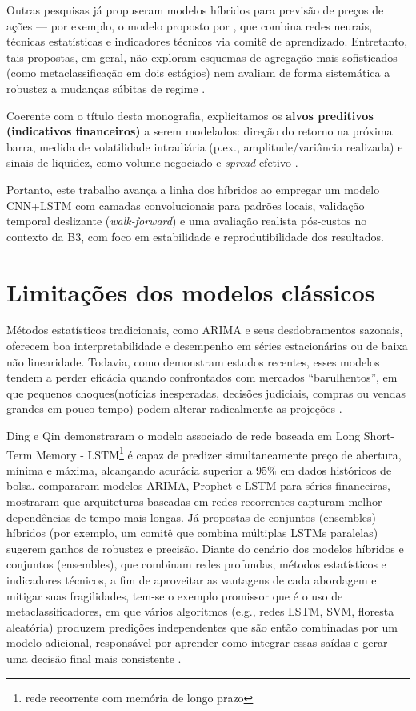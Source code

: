 Outras pesquisas já propuseram modelos híbridos para previsão de preços de ações — por exemplo, o modelo proposto por \cite{marcondes2013modelo}, que combina redes neurais, técnicas estatísticas e indicadores técnicos via comitê de aprendizado. Entretanto, tais propostas, em geral, não exploram esquemas de agregação mais sofisticados (como metaclassificação em dois estágios) nem avaliam de forma sistemática a robustez a mudanças súbitas de regime \cite{assis2022predicao,tsay2010}. 

Coerente com o título desta monografia, explicitamos os \textbf{alvos preditivos (indicativos financeiros)} a serem modelados: direção do retorno na próxima barra,  medida de volatilidade intradiária (p.ex., amplitude/variância realizada) e sinais de liquidez, como volume negociado e \textit{spread} efetivo \cite{tsay2010,dacorogna2001,wood1985,MishkinEakins2018,rotela2014arima,nascimento2023bwaif}. 

Portanto, este trabalho avança a linha dos híbridos ao empregar um modelo CNN+LSTM com camadas convolucionais para padrões locais, validação temporal deslizante (\textit{walk-forward}) e uma avaliação realista pós-custos no contexto da B3, com foco em estabilidade e reprodutibilidade dos resultados.




\section{Limitações dos modelos clássicos}

Métodos estatísticos tradicionais, como ARIMA e seus desdobramentos sazonais, oferecem boa interpretabilidade e desempenho em séries estacionárias ou de baixa não linearidade. Todavia, como demonstram estudos recentes, esses modelos tendem a perder eficácia quando confrontados com mercados “barulhentos”, em que pequenos choques(notícias inesperadas, decisões judiciais, compras ou vendas grandes em pouco tempo) podem alterar radicalmente as projeções \cite{sunki2024}. 

Ding e Qin \cite{ding2020} demonstraram o modelo associado de rede baseada em Long Short-Term Memory - LSTM\footnote{rede recorrente com memória de longo prazo} é capaz de predizer simultaneamente preço de abertura, mínima e máxima, alcançando acurácia superior a 95\% em dados históricos de bolsa. \cite{nascimento2023bwaif} compararam modelos ARIMA, Prophet e LSTM para séries financeiras, mostraram que arquiteturas baseadas em redes recorrentes capturam melhor dependências de tempo mais longas. Já propostas de conjuntos (ensembles) híbridos (por exemplo, um comitê que combina múltiplas LSTMs paralelas) sugerem ganhos de robustez e precisão. Diante do cenário dos modelos híbridos e conjuntos (ensembles), que combinam redes profundas, métodos estatísticos e indicadores técnicos, a fim de aproveitar as vantagens de cada abordagem e mitigar suas fragilidades, tem-se o exemplo promissor que é o uso de metaclassificadores, em que vários algoritmos (e.g., redes LSTM, SVM, floresta aleatória) produzem predições independentes que são então combinadas por um modelo adicional, responsável por aprender como integrar essas saídas e gerar uma decisão final mais consistente \cite{assis2022predicao}.

